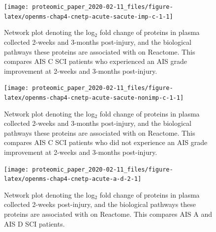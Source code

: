 \documentclass[9pt,lineno]{elife}
\begin{document}
\begin{landscape}



\begin{figure}

{\centering \texttt{[image: proteomic\_paper\_2020-02-11\_files/figure-latex/openms-chap4-cnetp-acute-sacute-imp-c-1-1]} 

}

\caption[Network plot - label-free - Acute C Improvers VS Subacute C Improvers]{Network plot denoting the log\(_2\) fold change of proteins in plasma collected 2-weeks and 3-months post-injury, and the biological pathways these proteins are associated with on Reactome. This compares AIS C SCI patients who experienced an AIS grade improvement at 2-weeks and 3-months post-injury.}\label{fig:openms-chap4-cnetp-acute-sacute-imp-c-1}
\end{figure}

\end{landscape}
\begin{landscape}



\begin{figure}

{\centering \texttt{[image: proteomic\_paper\_2020-02-11\_files/figure-latex/openms-chap4-cnetp-acute-sacute-nonimp-c-1-1]} 

}

\caption[Network plot - label-free - Acute C Non-Imporvers VS Subacute C Non-Improvers]{Network plot denoting the log\(_2\) fold change of proteins in plasma collected 2-weeks and 3-months post-injury, and the biological pathways these proteins are associated with on Reactome. This compares AIS C SCI patients who did not experience an AIS grade improvement at 2-weeks and 3-months post-injury.}\label{fig:openms-chap4-cnetp-acute-sacute-nonimp-c-1}
\end{figure}

\end{landscape}
\begin{landscape}



\begin{figure}

{\centering \texttt{[image: proteomic\_paper\_2020-02-11\_files/figure-latex/openms-chap4-cnetp-acute-a-d-2-1]} 

}

\caption[Network plot - label-free - Acute A VS Acute D]{Network plot denoting the log\(_2\) fold change of proteins in plasma collected 2-weeks post-injury, and the biological pathways these proteins are associated with on Reactome. This compares AIS A and AIS D SCI patients.}\label{fig:openms-chap4-cnetp-acute-a-d-2}
\end{figure}

\end{landscape}
\end{document}
